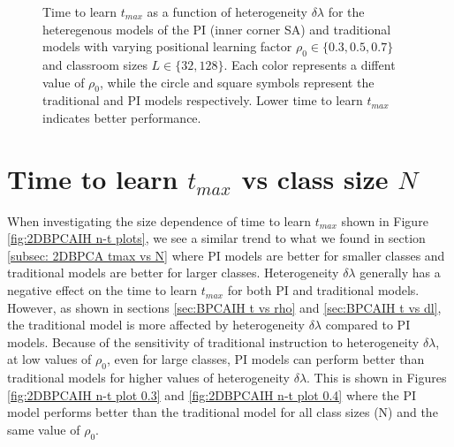 \begin{figure}[htbp!]
   \centering
   \caption{Time to learn $t_{max}$ as a function of heterogeneity $\delta\lambda$ for the heteregenous models of the PI (inner corner SA) and traditional models with varying positional learning factor $\rho_0\in\lbrace 0.3,0.5,0.7 \rbrace$ and classroom sizes $L\in\lbrace32,128\rbrace$. 
   Each color represents a diffent value of $\rho_0$, while the circle and square symbols represent the traditional and PI models respectively.
   Lower time to learn $t_{max}$ indicates better performance.
   }
   \label{fig:2DBPCAIH dl-t plots}
\end{figure}

\newpage %

\section{Time to learn $t_{max}$ vs class size $N$}\label{sec:BPCAIH m vs dl}

When investigating the size dependence of time to learn $t_{max}$ shown in Figure \ref{fig:2DBPCAIH n-t plots}, we see a similar trend to what we found in section \ref{subsec: 2DBPCA tmax vs N} where PI models are better for smaller classes and traditional models are better for larger classes.
Heterogeneity $\delta\lambda$ generally has a negative effect on the time to learn $t_{max}$ for both PI and traditional models.
However, as shown in sections \ref{sec:BPCAIH t vs rho} and \ref{sec:BPCAIH t vs dl}, the traditional model is more affected by heterogeneity $\delta\lambda$ compared to PI models.
Because of the sensitivity of traditional instruction to heterogeneity $\delta\lambda$, at low values of $\rho_0$, even for large classes, PI models can perform better than traditional models for higher values of heterogeneity $\delta\lambda$.
This is shown in Figures \ref{fig:2DBPCAIH n-t plot 0.3} and \ref{fig:2DBPCAIH n-t plot 0.4} where the PI model performs better than the traditional model for all class sizes (N) and the same value of $\rho_0$.

